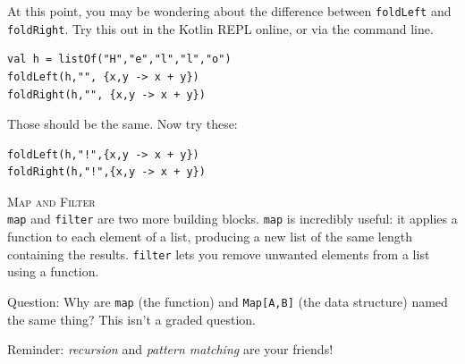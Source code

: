 \documentclass[12pt,a4paper]{exam}
\begin{document}
\begin{questions}
At this point, you may be wondering about the difference between \verb!foldLeft! and 
\verb!foldRight!. Try this out in the Kotlin REPL online, or via the command line.
\begin{Verbatim}
val h = listOf("H","e","l","l","o")
foldLeft(h,"", {x,y -> x + y})
foldRight(h,"", {x,y -> x + y})
\end{Verbatim}
Those should be the same. Now try these:
\begin{Verbatim}
foldLeft(h,"!",{x,y -> x + y})
foldRight(h,"!",{x,y -> x + y})
\end{Verbatim}

\question
\textsc{Map and Filter}\\
\verb!map! and \verb!filter! are two more building blocks. \verb!map! is incredibly useful: 
it applies a function to each element of a list, producing a new list of the same length 
containing the results. \verb!filter! lets you remove unwanted elements from a list using a function.

Question: Why are \verb!map! (the function) and \verb!Map[A,B]! (the data structure) named the same thing?
This isn’t a graded question.

Reminder: \emph{recursion} and \emph{pattern matching} are your friends!
\end{questions}
\end{document}

